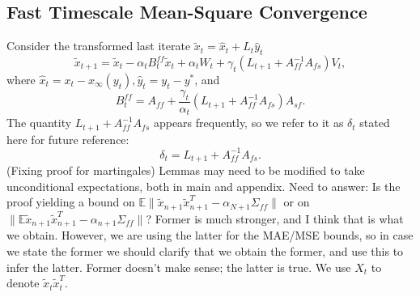 \subsection{Fast Timescale Mean-Square Convergence}\label{sec:fast_mse}
Consider the transformed last iterate $\tilde{x}_t = \hat{x}_t + L_t \hat{y}_t$ 
\begin{equation}\label{eq:fast_recursion}
    \tilde{x}_{t+1} = \tilde{x}_t - \alpha_t B_t^{ff} \tilde{x}_t + \alpha_t W_t + \gamma_t (L_{t+1} + A_{ff}^{-1}A_{fs} ) V_t ,   
\end{equation}
where $\hat{x}_t = x_t - x_\infty (y_t), \hat{y}_t = y_t - y^*$, and 
\begin{equation}\label{eq:Bt_ff}
    B_t^{ff} = A_{ff} + \frac{\gamma_t}{\alpha_t}(L_{t+1} + A_{ff}^{-1} A_{fs}) A_{sf} .
\end{equation}
The quantity $L_{t+1} + A_{ff}^{-1} A_{fs}$ appears frequently, so we refer to it as $\delta_t$ stated here for future reference:
\begin{equation}\label{eq:delta}
    \delta_t = L_{t+1} + A_{ff}^{-1} A_{fs}.
\end{equation}
{\color{red}(Fixing proof for martingales) Lemmas may need to be modified to take unconditional expectations, both in main and appendix.
Need to answer: Is the proof yielding a bound on $\mathbb{E}\lVert \tilde{x}_{n+1} \tilde{x}_{n+1}^T - \alpha_{N+1} \Sigma_{ff} \rVert$ or on $\lVert \mathbb{E} \tilde{x}_{n+1} \tilde{x}_{n+1}^T - \alpha_{n+1} \Sigma_{ff} \rVert$? 
Former is much stronger, and I think that is what we obtain. 
However, we are using the latter for the MAE/MSE bounds, so in case we state the former we should clarify that we obtain the former, and use this to infer the latter. 
Former doesn't make sense; the latter is true. 
}
We use $X_t$ to denote $\tilde{x}_t \tilde{x}_t^T$. 

